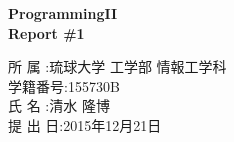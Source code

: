 \documentclass[12pt]{jarticle} %
\begin{document}
\begin{titlepage}
    \begin{center} %
        \fontsize{25pt}{0pt}\selectfont %
        \vspace*{100truept}
        \bf{ProgrammingII}\\ %
        \vspace*{10truept}
        \bf{Report  \#1}\\ %
        \vspace{340truept}
    \end{center}
    \begin{flushright}
        {\large
            \fontsize{16pt}{0pt}\selectfont
          所  属  :琉球大学 工学部 情報工学科\\
            \vspace{5truept}
          学籍番号:155730B\\
            \vspace{5truept}
          氏  名  :清水 隆博\\
            \vspace{5truept}
          提 出 日:2015年12月21日\\
            \vspace{5truept}
        }    
    \end{flushright}
\end{titlepage}

\tableofcontents %
\setcounter{page}{1} %
\pagestyle{plain}

\newpage
\end{document}
